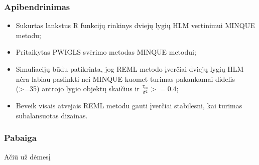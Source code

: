 \documentclass[utf8,hyperref={unicode,pdftex}]{beamer}
\begin{document}
\begin{frame}
\frametitle{Apibendrinimas}
\begin{itemize}
\item Sukurtas lankstus R funkcijų rinkinys dviejų lygių HLM vertinimui MINQUE metodu;
\item Pritaikytas PWIGLS svėrimo metodas MINQUE metodui;
\item Simuliacijų būdu patikrinta, jog REML metodo įverčiai dviejų lygių HLM nėra labiau paslinkti nei MINQUE kuomet turimas pakankamai didelis (>=35) antrojo lygio objektų skaičius ir $\frac{\tau_{00}}{\sigma^2}>=0.4$;
\item Beveik visais atvejais REML metodu gauti įverčiai stabilesni, kai turimas subalansuotas dizainas.

\end{itemize}
\end{frame}

\begin{frame}
\frametitle{Pabaiga}
\huge
Ačiū už dėmesį
\end{frame}
\end{document}
